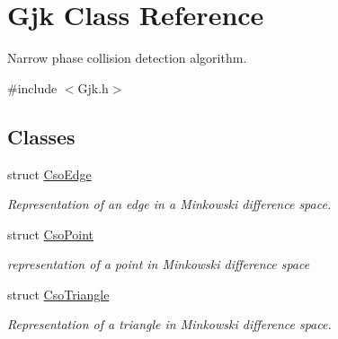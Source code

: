 \hypertarget{classGjk}{}\section{Gjk Class Reference}
\label{classGjk}


Narrow phase collision detection algorithm.  




{\ttfamily \#include $<$Gjk.\+h$>$}

\subsection*{Classes}
\begin{DoxyCompactItemize}
\item 
struct \hyperlink{structGjk_1_1CsoEdge}{Cso\+Edge}
\begin{DoxyCompactList}\small\item\em Representation of an edge in a Minkowski difference space. \end{DoxyCompactList}\item 
struct \hyperlink{structGjk_1_1CsoPoint}{Cso\+Point}
\begin{DoxyCompactList}\small\item\em representation of a point in Minkowski difference space \end{DoxyCompactList}\item 
struct \hyperlink{structGjk_1_1CsoTriangle}{Cso\+Triangle}
\begin{DoxyCompactList}\small\item\em Representation of a triangle in Minkowski difference space. \end{DoxyCompactList}\end{DoxyCompactItemize}
